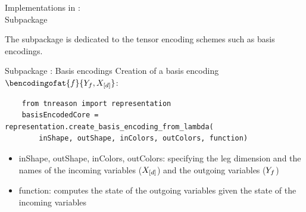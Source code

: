 \documentclass{beamer}
\begin{document}
    \begin{frame}{Implementations in \tnreason{}: \\
    Subpackage \sprepresentation{}}

        The subpackage \sprepresentation{} is dedicated to the tensor encoding schemes such as basis encodings.

        \begin{center}
        \end{center}

    \end{frame}

    \begin{frame}[fragile]{Subpackage \sprepresentation{}: Basis encodings}
        Creation of a basis encoding $\bencodingofat{\exformula}{\headvariableof{\exformula},\shortcatvariables}$:
        \begin{verbatim}
    from tnreason import representation
    basisEncodedCore = representation.create_basis_encoding_from_lambda(
        inShape, outShape, inColors, outColors, function)
        \end{verbatim}
        \begin{itemize}
            \item inShape, outShape, inColors, outColors: specifying the leg dimension and the names of the incoming variables ($X_{[d]}$) and the outgoing variables ($Y_{f}$)
            \item function: computes the state of the outgoing variables given the state of the incoming variables
        \end{itemize}

    \end{frame}
\end{document}
